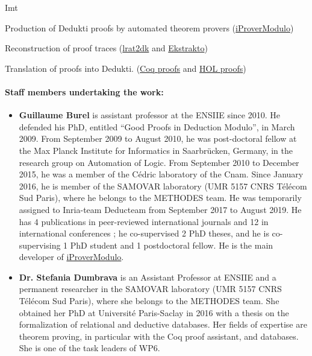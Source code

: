 \begin{sitedescription}{Imt}
\begin{compactitem}
\item Production of Dedukti proofs by automated theorem provers (\href{http://www.ensiie.fr/~guillaume.burel/blackandwhite_iProverModulo.html.en}{iProverModulo})
\item Reconstruction of proof traces
  (\href{https://github.com/gburel/lrat2dk}{lrat2dk} and \href{https://github.com/Deducteam/ekstrakto}{Ekstrakto})
\item Translation of proofs into Dedukti. (\href{http://www.ensiie.fr/~guillaume.burel/blackandwhite_coqInE.html.en}{Coq
  proofs} and \href{http://deducteam.gforge.inria.fr/holide/}{HOL
  proofs})
\end{compactitem}

\paragraph{Staff members undertaking the work:}

\begin{itemize} %

\item{\bf Guillaume Burel}
 is
assistant professor at the ENSIIE since 2010. He defended his PhD,
entitled ``Good Proofs in Deduction Modulo'', in March 2009. From
September 2009 to August 2010, he was post-doctoral fellow at the Max
Planck Institute for Informatics in Saarbrücken, Germany, in the
research group on Automation of Logic. From September 2010 to December
2015, he was a member of the Cédric laboratory of the Cnam. Since
January 2016, he is member of the SAMOVAR laboratory (UMR 5157 CNRS
Télécom Sud Paris), where he belongs to the METHODES team. He was
temporarily assigned to Inria-team Deducteam from September 2017 to
August 2019.  He has 4
publications in peer-reviewed international journals and 12 in
international conferences ; he co-supervised 2 PhD theses, and he is
co-supervising 1 PhD student and 1 postdoctoral fellow. He is the
main developer of
\href{http://www.ensiie.fr/~guillaume.burel/blackandwhite_iProverModulo.html.en}{iProverModulo}.

\item{\bf Dr. Stefania Dumbrava}
is an Assistant Professor at ENSIIE and a permanent researcher in the SAMOVAR laboratory (UMR 5157 CNRS Télécom
Sud Paris), where she belongs to the METHODES team. She obtained her PhD at Université Paris-Saclay in 2016 with a thesis on the formalization 
of relational and deductive databases. Her fields of expertise are theorem proving, in particular with the Coq proof assistant, and databases. 
She is one of the task leaders of WP6. 
\end{itemize}



\end{sitedescription}

